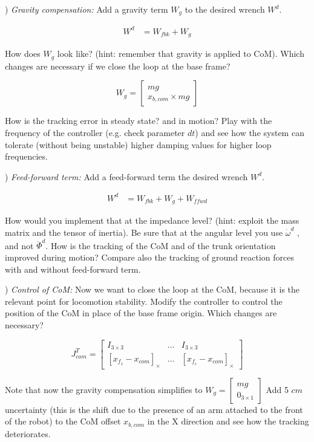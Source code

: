 \documentclass[11pt]{article}
\newcommand{\mat}[1]{\ensuremath{\begin{bmatrix}#1\end{bmatrix}}}	%
\begin{document}
) \textit{Gravity compensation:}
Add a gravity term $W_g$ to the desired wrench $W^d$.

\begin{align}
W^d &= W_{fbk} +  W_g
\end{align}

How does $W_g$ look like? (hint: remember that gravity is applied to CoM). Which changes are necessary if we close the loop at the base frame?

\begin{equation}
W_g = \mat{mg \\ x_{b,com} \times mg}
\end{equation}

How is the tracking error in steady state? and in motion? 
Play with the frequency of the controller (e.g. check parameter $dt$) and see how the system can tolerate (without being unstable)  higher damping values for higher loop frequencies.


) \textit{Feed-forward term:}
Add a feed-forward term the desired wrench $W^d$. 

\begin{align}
W^d &= W_{fbk} +  W_g + W_{ffwd}
\end{align}

How would you implement that at the impedance level? (hint: exploit the mass matrix and the tensor of inertia). Be sure that at the angular level you use $\dot{\omega}^d$ , and not $\ddot{\Phi}^d$.
How is the tracking of the CoM and of the trunk orientation improved during motion? 
Compare also the tracking of ground reaction  forces with and without feed-forward term.



\quad

) \textit{Control of CoM:}
Now we want to close the loop at the CoM, because it is the relevant point for locomotion stability. Modify the controller to control the position of the CoM in place of the base frame origin.
Which changes are necessary?


\begin{equation}
J_{com}^T = \mat{I_{3\times3} & \dots & I_{3\times3} \\
	[x_{f_1} - x_{com}]_{\times} & \dots & [x_{f_c} - x_{com}]_{\times}}
\end{equation}

Note that now  the gravity compensation simplifies to $W_g = \mat{ mg \\ 0_{3 \times 1} }$
Add 5 $cm$ uncertainty (this is the shift due to the presence of an arm attached to the front of the robot) to the CoM offset $x_{b,com}$ in the X direction and see how the tracking deteriorates. 
\end{document}
